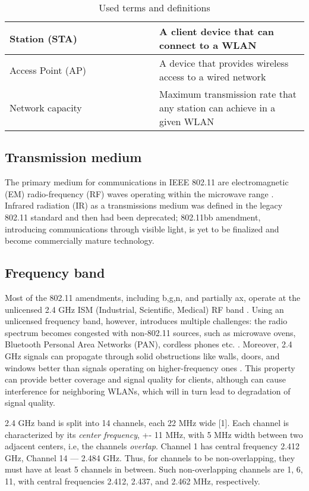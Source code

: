 \begin{table}[h]
\begin{tabular}{| p{0.5\linewidth} | p{0.5\linewidth} |}
        \hline
        Station (STA) & A client device that can connect to a WLAN \\
        \hline
        Access Point (AP) & A device that provides wireless access to a wired network \\
        \hline
        Network capacity & Maximum transmission rate that any station can achieve in a given WLAN \\
        \hline
    \end{tabular}
    \caption{Used terms and definitions}
    \label{tab:my_label}
\end{table}

\subsection{Transmission medium}

The primary medium for communications in IEEE 802.11 are electromagnetic (EM) radio-frequency (RF) waves operating within the microwave range \cite{tanenbaumComputerNetworks2020}. Infrared radiation (IR) as a transmissions medium was defined in the legacy 802.11 standard and then had been deprecated; 802.11bb amendment, introducing communications through visible light, is yet to be finalized and become commercially mature technology.

\subsection{Frequency band}

Most of the 802.11 amendments, including b,g,n, and partially ax, operate at the unlicensed 2.4 GHz ISM (Industrial, Scientific, Medical) RF band \cite{tanenbaumComputerNetworks2020, colemanCWNACertifiedWireless2021}. Using an unlicensed frequency band, however, introduces multiple challenges: the radio spectrum becomes congested with non-802.11 sources, such as microwave ovens, Bluetooth Personal Area Networks (PAN), cordless phones etc. \cite{tanenbaumComputerNetworks2020, colemanCWNACertifiedWireless2021}. Moreover, 2.4 GHz signals can propagate through solid obstructions like walls, doors, and windows better than signals operating on higher-frequency ones \cite{colemanCWNACertifiedWireless2021}. This property can provide better coverage and signal quality for clients, although can cause interference for neighboring WLANs, which will in turn lead to degradation of signal quality.

2.4 GHz band is split into 14 channels, each 22 MHz wide [1]. Each channel is characterized by its \textit{center frequency}, +- 11 MHz, with 5 MHz width between two adjacent centers, i.e, the channels \textit{overlap}. Channel 1 has central frequency 2.412 GHz, Channel 14 — 2.484 GHz. Thus, for channels to be non-overlapping, they must have at least 5 channels in between. Such non-overlapping channels are 1, 6, 11, with central frequencies 2.412, 2.437, and 2.462 MHz, respectively.

